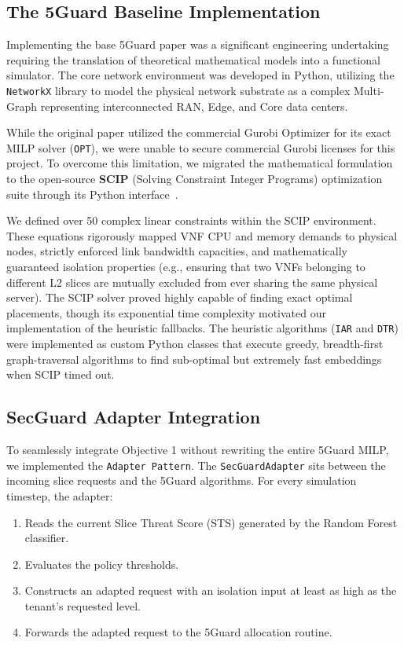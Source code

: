 \subsection{The 5Guard Baseline Implementation}
Implementing the base 5Guard paper was a significant engineering undertaking requiring the translation of theoretical mathematical models into a functional simulator. The core network environment was developed in Python, utilizing the \texttt{NetworkX} library to model the physical network substrate as a complex Multi-Graph representing interconnected RAN, Edge, and Core data centers. 

While the original paper utilized the commercial Gurobi Optimizer for its exact MILP solver (\texttt{OPT}), we were unable to secure commercial Gurobi licenses for this project. To overcome this limitation, we migrated the mathematical formulation to the open-source \textbf{SCIP} (Solving Constraint Integer Programs) optimization suite through its Python interface~\cite{gamrath2022scip}.

We defined over 50 complex linear constraints within the SCIP environment. These equations rigorously mapped VNF CPU and memory demands to physical nodes, strictly enforced link bandwidth capacities, and mathematically guaranteed isolation properties (e.g., ensuring that two VNFs belonging to different L2 slices are mutually excluded from ever sharing the same physical server). The SCIP solver proved highly capable of finding exact optimal placements, though its exponential time complexity motivated our implementation of the heuristic fallbacks. The heuristic algorithms (\texttt{IAR} and \texttt{DTR}) were implemented as custom Python classes that execute greedy, breadth-first graph-traversal algorithms to find sub-optimal but extremely fast embeddings when SCIP timed out.

\subsection{SecGuard Adapter Integration}
To seamlessly integrate Objective 1 without rewriting the entire 5Guard MILP, we implemented the \texttt{Adapter Pattern}. The \texttt{SecGuardAdapter} sits between the incoming slice requests and the 5Guard algorithms. 
For every simulation timestep, the adapter:
\begin{enumerate}
    \item Reads the current Slice Threat Score (STS) generated by the Random Forest classifier.
    \item Evaluates the policy thresholds.
    \item Constructs an adapted request with an isolation input at least as high as the tenant's requested level.
    \item Forwards the adapted request to the 5Guard allocation routine.
\end{enumerate}

